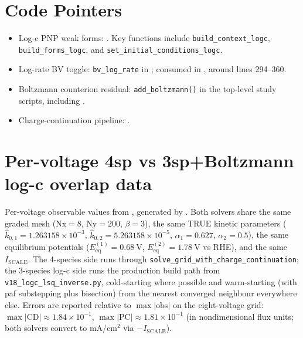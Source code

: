 \documentclass[11pt]{article}
\begin{document}
\section*{Code Pointers}
\begingroup
\small
\sloppy
\begin{itemize}
  \item Log-c PNP weak forms: . Key
        functions include \texttt{build\_context\_logc},
        \texttt{build\_forms\_logc}, and
        \texttt{set\_initial\_conditions\_logc}.
  \item Log-rate BV toggle: \texttt{bv\_log\_rate} in
        ; consumed in
        , around lines 294--360.
  \item Boltzmann counterion residual: \texttt{add\_boltzmann()} in the
        top-level study scripts, including
        .
  \item Charge-continuation pipeline:
        .
\end{itemize}
\endgroup

\appendix
\section{Per-voltage 4sp vs 3sp+Boltzmann log-c overlap data}
Per-voltage observable values from
, generated
by . Both solvers
share the same graded mesh (Nx$=8$, Ny$=200$, $\beta=3$), the same TRUE
kinetic parameters ($\hat{k}_{0,1} = 1.263158\times 10^{-3}$,
$\hat{k}_{0,2} = 5.263158\times 10^{-5}$, $\alpha_1 = 0.627$,
$\alpha_2 = 0.5$), the same equilibrium potentials ($E_{\mathrm{eq}}^{(1)} =
\SI{0.68}{\volt}$, $E_{\mathrm{eq}}^{(2)} = \SI{1.78}{\volt}$ vs RHE), and
the same $I_{\mathrm{SCALE}}$. The 4-species side runs through
\texttt{solve\_grid\_with\_charge\_continuation}; the 3-species log-c side
runs the production build path from \texttt{v18\_logc\_lsq\_inverse.py},
cold-starting where possible and warm-starting (with paf substepping plus
bisection) from the nearest converged neighbour everywhere else. Errors
are reported relative to $\max|\mathrm{obs}|$ on the eight-voltage grid:
$\max|\mathrm{CD}| \approx 1.84\times 10^{-1}$,
$\max|\mathrm{PC}| \approx 1.81\times 10^{-1}$ (in nondimensional flux units;
both solvers convert to mA/cm$^{2}$ via $-I_{\mathrm{SCALE}}$).
\end{document}
